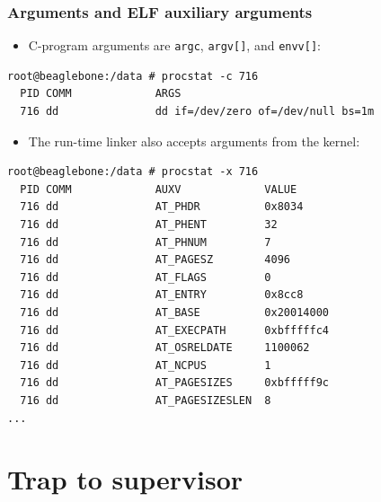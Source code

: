 \begin{frame}[fragile]
  \frametitle{Arguments and ELF auxiliary arguments}

  \pause

  \begin{itemize}
    \item C-program arguments are \texttt{argc}, \texttt{argv[]}, and
      \texttt{envv[]}:
  \end{itemize}

  \pause

  \begin{scriptsize}
\begin{verbatim}
root@beaglebone:/data # procstat -c 716
  PID COMM             ARGS                                                 
  716 dd               dd if=/dev/zero of=/dev/null bs=1m
\end{verbatim}
  \end{scriptsize}

  \pause

  \begin{itemize}
    \item The run-time linker also accepts arguments from the kernel:
  \end{itemize}

  \pause

  \begin{scriptsize}
\begin{verbatim}
root@beaglebone:/data # procstat -x 716
  PID COMM             AUXV             VALUE           
  716 dd               AT_PHDR          0x8034
  716 dd               AT_PHENT         32
  716 dd               AT_PHNUM         7
  716 dd               AT_PAGESZ        4096
  716 dd               AT_FLAGS         0
  716 dd               AT_ENTRY         0x8cc8
  716 dd               AT_BASE          0x20014000
  716 dd               AT_EXECPATH      0xbfffffc4
  716 dd               AT_OSRELDATE     1100062
  716 dd               AT_NCPUS         1
  716 dd               AT_PAGESIZES     0xbfffff9c
  716 dd               AT_PAGESIZESLEN  8
...
\end{verbatim}
  \end{scriptsize}
\end{frame}

\section{Trap to supervisor}

